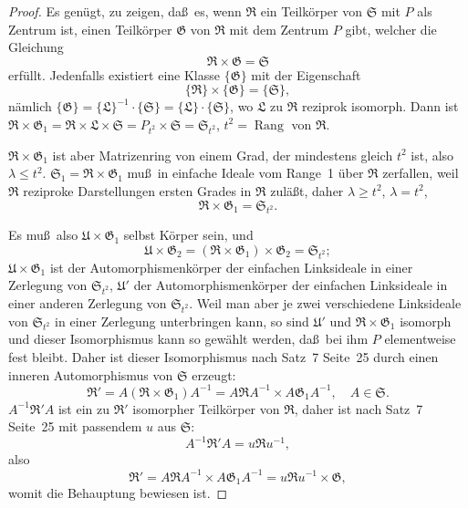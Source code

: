 \documentclass[12pt,a4paper]{article}
\theoremstyle{plain}
\theoremstyle{definition}
\theoremstyle{remark}
\DeclareMathOperator{\Rang}{Rang}
\begin{document}
\begin{proof}
Es gen\"ugt, zu zeigen, da\ss\ es, wenn $\mathfrak{R}$ ein Teilk\"orper von $\mathfrak{S}$ mit $P$ als
Zentrum ist, einen Teilk\"orper $\mathfrak{G}$ von $\mathfrak{R}$ mit dem Zentrum $P$ gibt, welcher
die Gleichung
\[
\mathfrak{R} \times \mathfrak{G} = \mathfrak{S}
\]
erf\"ullt. Jedenfalls existiert eine Klasse $\{\mathfrak{G}\}$ mit der Eigenschaft
\[
\{\mathfrak{R}\} \times \{\mathfrak{G}\} = \{\mathfrak{S}\},
\]
n\"amlich $\{\mathfrak{G}\} = \{\mathfrak{L}\}^{-1} \cdot \{\mathfrak{S}\} = \{\mathfrak{L}\} \cdot \{\mathfrak{S}\}$,
wo $\mathfrak{L}$ zu $\mathfrak{R}$ reziprok isomorph. Dann ist $\mathfrak{R} \times \mathfrak{G}_{1} = \mathfrak{R} \times \mathfrak{L} \times \mathfrak{S}
= P_{t^{2}} \times \mathfrak{S} = \mathfrak{S}_{t^{2}}$, $t^{2} = \Rang$ von $\mathfrak{R}$.

$\mathfrak{R} \times \mathfrak{G}_{1}$ ist aber Matrizenring von einem Grad, der mindestens gleich $t^{2}$
ist, also $\lambda \leq t^{2}$. $\mathfrak{S}_{1} = \mathfrak{R} \times \mathfrak{G}_{1}$ mu\ss\ in einfache Ideale vom Range~1
\"uber $\mathfrak{R}$ zerfallen, weil $\mathfrak{R}$ reziproke Darstellungen ersten Grades in $\mathfrak{R}$ zul\"a\ss t,
daher $\lambda \geq t^{2}$, $\lambda = t^{2}$,
\[
\mathfrak{R} \times \mathfrak{G}_{1} = \mathfrak{S}_{t^{2}}.
\]

Es mu\ss\ also $\mathfrak{U} \times \mathfrak{G}_{1}$ selbst K\"orper sein, und
\[
\mathfrak{U} \times \mathfrak{G}_{2} = (\mathfrak{R} \times \mathfrak{G}_{1}) \times \mathfrak{G}_{2} = \mathfrak{S}_{t^{2}};
\]
$\mathfrak{U} \times \mathfrak{G}_{1}$ ist der Automorphismenk\"orper der einfachen Linksideale in einer
Zerlegung von $\mathfrak{S}_{t^{2}}$, $\mathfrak{U}'$ der Automorphismenk\"orper der einfachen Linksideale
in einer anderen Zerlegung von $\mathfrak{S}_{t^{2}}$. Weil man aber je zwei verschiedene
Linksideale von $\mathfrak{S}_{t^{2}}$ in einer Zerlegung unterbringen kann, so sind $\mathfrak{U}'$ und
$\mathfrak{R} \times \mathfrak{G}_{1}$ isomorph und dieser Isomorphismus kann so gew\"ahlt werden, da\ss\ bei ihm $P$ elementweise fest bleibt. Daher ist dieser Isomorphismus nach
Satz~7 Seite~25 durch einen inneren Automorphismus von $\mathfrak{S}$ erzeugt:
\[
\mathfrak{R}' = A(\mathfrak{R} \times \mathfrak{G}_{1})A^{-1} = A\mathfrak{R}A^{-1} \times A\mathfrak{G}_{1}A^{-1},
\quad A \in \mathfrak{S}.
\]
$A^{-1}\mathfrak{R}'A$ ist ein zu $\mathfrak{R}'$ isomorpher Teilk\"orper von $\mathfrak{R}$, daher ist nach Satz~7
Seite~25 mit passendem $u$ aus $\mathfrak{S}$:
\[
A^{-1}\mathfrak{R}'A = u\mathfrak{R}u^{-1},
\]
also
\[
\mathfrak{R}' = A\mathfrak{R}A^{-1} \times A\mathfrak{G}_{1}A^{-1} = u\mathfrak{R}u^{-1} \times \mathfrak{G},
\]
womit die Behauptung bewiesen ist.
\end{proof}
\end{document}
